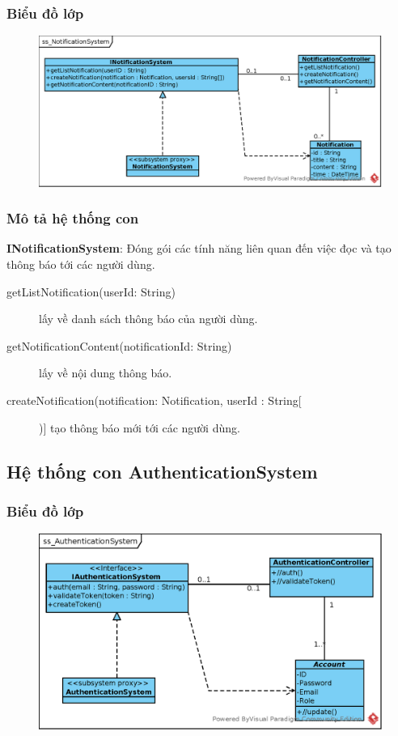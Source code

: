 \documentclass[./../main_file.tex]{subfiles}
\begin{document}
		\subsubsection{Biểu đồ lớp}
		\begin{figure}[H]
			\centering
			\includegraphics[width=\linewidth]{./images/ss_NotificationSystem.eps}
		\end{figure}
		\subsubsection{Mô tả hệ thống con}
		\textbf{INotificationSystem}: Đóng gói các tính năng liên quan đến việc đọc và tạo thông báo tới các người dùng.
		\begin{description}
			\item[getListNotification(userId: String)] lấy về danh sách thông báo của người dùng.
			\item[getNotificationContent(notificationId: String)] lấy về nội dung thông báo.
			\item[createNotification(notification: Notification, userId : String[])] tạo thông báo mới tới các người dùng.
		\end{description}
		
		
	\subsection{Hệ thống con AuthenticationSystem}
		\subsubsection{Biểu đồ lớp}
		\begin{figure}[H]
			\centering
			\includegraphics[width=\linewidth]{./images/ss_AuthenticationSystem.eps}
		\end{figure}
\end{document}
